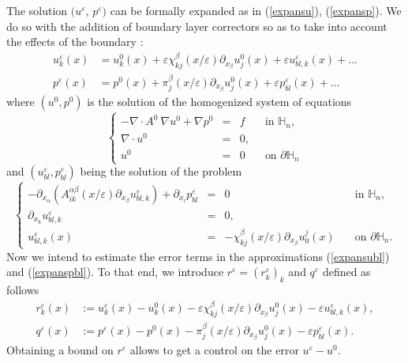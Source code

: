 \documentclass[11pt, reqno]{amsart}
\theoremstyle{definition}
\theoremstyle{remark}
\numberwithin{equation}{section}
\begin{document}
	\noindent The solution  $(u^\varepsilon$, $p^\varepsilon)$  can be formally expanded as in (\ref{expansu}), (\ref{expansp}). We do so with the addition of  boundary layer correctors so as to take into account the effects of the boundary :
	\begin{align}
		u_k^\varepsilon(x)&=u_k^0(x)+ \varepsilon	\chi^{\beta}_{kj}(x/\varepsilon)\partial_{x_{\beta}}u_j^0 (x)	 + \varepsilon u^\varepsilon_{bl,k}  (x) +...\label{expansubl}\\
		p^\varepsilon(x)&=  p^0(x)+ \pi^{\beta}_{j}(x/\varepsilon)\partial_{x_{\beta}}u^0_j(x)+\varepsilon  p^\varepsilon_{bl}  (x) + ...\label{expanspbl}
	\end{align}
	where $(u^0,p^0)$ is the solution of the homogenized system of equations
	\begin{equation}\label{hphom0bv}
		\left\{
		\begin{array}{rcll}
			-\nabla\cdot A^0 \: \nabla u^0 +  \nabla p^0&=& f \quad &\mbox{in } {\mathbb{H}}_n,\\
			\nabla\cdot u^0&=& 0 ,\\
			u^0 &=& 0\quad  &\mbox{on } \partial{\mathbb{H}}_n
		\end{array}
		\right. 
	\end{equation}
	and $(u^\varepsilon_{bl} , p^\varepsilon_{bl} )$ being the solution of the problem 
	\begin{equation}\label{eq_uepsbl}
		\left\{
		\begin{array}{rcll}
			-\partial_{x_\alpha}( A^{\alpha\beta}_{ik}(x/\varepsilon)  \partial_{x_\beta}u^\varepsilon_{bl,k})  + \partial_{x_i} p^\varepsilon_{bl} &=& 0  &\mbox{in } {\mathbb{H}}_n,\\
			\partial_{x_k} u^\varepsilon_{bl,k} &=& 0 , &\\
			u^\varepsilon_{bl,k} (x) &=& -\chi^{\beta}_{kj}(x/\varepsilon)\partial_{ x_{\beta}}  u^j_0   (x)\quad  &\mbox{on } \partial{\mathbb{H}}_n.
		\end{array}
		\right. 
	\end{equation}
	Now we intend to estimate the error terms in the approximations (\ref{expansubl}) and (\ref{expanspbl}). To that end, we introduce $r^\varepsilon=(r^\varepsilon_k)_k$ and $q^\varepsilon$ defined as follows
	\begin{align}\label{errors_bl}
		r_k^\varepsilon(x)&:= u_k^\varepsilon(x) -u_k^0(x) - \varepsilon\chi^{\beta}_{kj}(x/\varepsilon)\partial_{ x_{\beta}}  u^0_j   (x) - \varepsilon u^\varepsilon_{bl,k}(x) ,\\
		q^\varepsilon(x)&:=p^\varepsilon(x)- p^0(x)- \pi^{\beta}_{j}(x/\varepsilon)\partial_{ x_{\beta}}  u^0_j   (x)   - \varepsilon p^\varepsilon_{bl}(x).
	\end{align}
	\noindent Obtaining a bound on  $r^\varepsilon$ allows to get a control on the error $ u^\varepsilon -u^0.$\\
	
\end{document}
